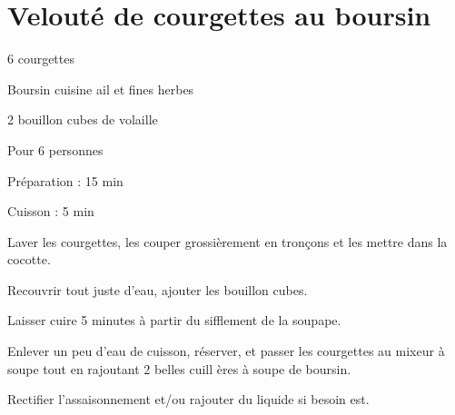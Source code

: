 \section[\normalsize{Velout\'e de courgettes au boursin}]{Velouté de courgettes au boursin}

\begin{ingredients}
\item 6 courgettes
\item Boursin cuisine ail et fines herbes
\item 2 bouillon cubes de volaille
\end{ingredients}
\begin{infos}
\item Pour 6 personnes
\item Préparation : 15 min
\item Cuisson : 5 min
\end{infos}
\begin{etapes}
\item Laver les courgettes, les couper grossi\`erement en 
tronçons et les mettre dans la cocotte. 
\item Recouvrir tout juste d’eau, ajouter les bouillon cubes. 
\item Laisser cuire 5 minutes \`a partir du sifflement de la 
soupape.
\item Enlever un peu d'eau de cuisson, r\'eserver, et passer les 
courgettes au mixeur \`a soupe tout en rajoutant 2 belles cuill
\`eres \`a soupe de boursin. 
\item Rectifier l'assaisonnement et/ou rajouter du liquide si 
besoin est.
\end{etapes}
\begin{conseils}
\end{conseils}


